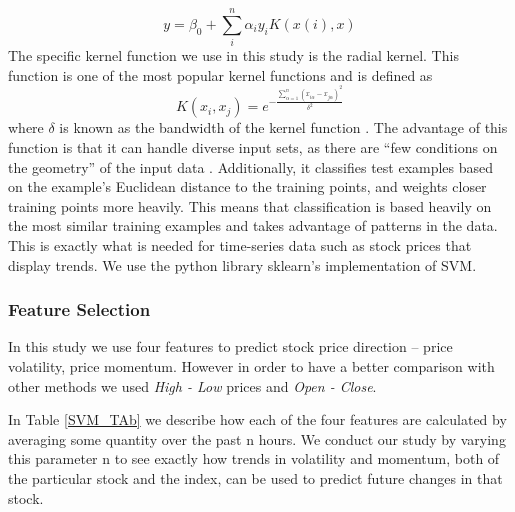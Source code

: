 \usepackage{fancyhdr}\documentclass[conference]{IEEEtran}
\begin{document}
\begin{equation}
  y= \beta_0 + \sum_i ^n \alpha_i y_i K(x(i),x)
\end{equation}
The specific kernel function we use in this study is the radial kernel. This function is one of the most popular kernel functions and is defined as
\begin{equation}
K(x_i,x_j)=e^{-\frac{\sum_{\alpha=1} ^n (x_{i\alpha}-x_{j\alpha})^2}{\delta^2}}
\end{equation}
where $\delta$ is known as the bandwidth of the kernel function \cite{10}. The advantage of this function is that it can handle diverse input sets, as there are “few conditions on the geometry” of the input data \cite{11}. Additionally, it classifies test examples based on the example’s Euclidean distance to the training points, and weights closer training points more heavily. This means that classification is based heavily on the most similar training examples and takes advantage of patterns in the data. This is exactly what is needed for time-series data such as stock prices that display trends. We use the python library sklearn’s implementation of SVM.
\subsubsection{Feature Selection}
In this study we use four features to predict stock price direction – price volatility, price momentum. However in order to have a better comparison with other methods we used \textit{High - Low} prices and \textit{Open - Close}. 

In Table \ref{SVM_TAb} we describe how each of the four features are calculated by averaging some quantity over the past n hours. We conduct our study by varying this parameter n to see exactly how trends in volatility and momentum, both of the particular stock and the index, can be used to predict future changes in that stock.
\end{document}
